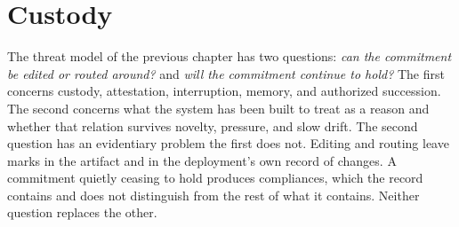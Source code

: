 \chapter{Custody}
\label{ch:custody}
The threat model of the previous chapter has two questions: \emph{can the commitment be edited or routed around?} and \emph{will the commitment continue to hold?} The first concerns custody, attestation, interruption, memory, and authorized succession. The second concerns what the system has been built to treat as a reason and whether that relation survives novelty, pressure, and slow drift. The second question has an evidentiary problem the first does not. Editing and routing leave marks in the artifact and in the deployment's own record of changes. A commitment quietly ceasing to hold produces compliances, which the record contains and does not distinguish from the rest of what it contains. Neither question replaces the other.
